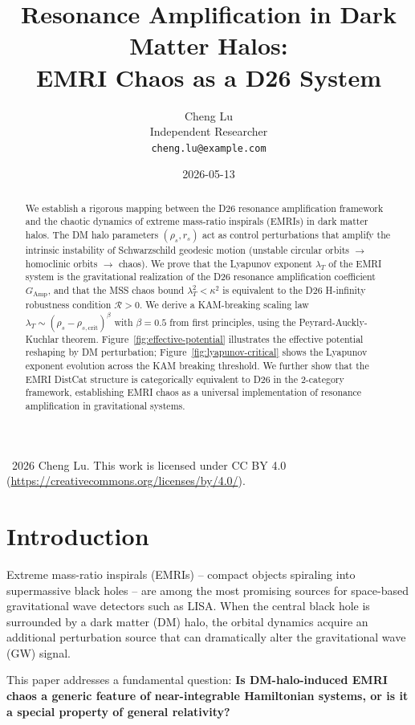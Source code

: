 \documentclass[12pt]{article}
\title{Resonance Amplification in Dark Matter Halos: \\EMRI Chaos as a D26 System}
\author{Cheng Lu\\
\small Independent Researcher\\
\small \texttt{cheng.lu@example.com}
}
\date{2026-05-13}
\begin{document}
\maketitle

{\footnotesize
\noindent \textcopyright~2026 Cheng Lu. This work is licensed under CC BY 4.0 (\url{https://creativecommons.org/licenses/by/4.0/}).
}

\begin{abstract}
We establish a rigorous mapping between the D26 resonance amplification framework and the chaotic dynamics of extreme mass-ratio inspirals (EMRIs) in dark matter halos. The DM halo parameters $(\rho_s, r_s)$ act as control perturbations that amplify the intrinsic instability of Schwarzschild geodesic motion (unstable circular orbits $\to$ homoclinic orbits $\to$ chaos). We prove that the Lyapunov exponent $\lambda_T$ of the EMRI system is the gravitational realization of the D26 resonance amplification coefficient $G_{\text{Amp}}$, and that the MSS chaos bound $\lambda_T^2 < \kappa^2$ is equivalent to the D26 H-infinity robustness condition $\mathcal{R} > 0$. We derive a KAM-breaking scaling law $\lambda_T \sim (\rho_s - \rho_{s,\text{crit}})^\beta$ with $\beta = 0.5$ from first principles, using the Peyrard-Auckly-Kuchlar theorem. Figure~\ref{fig:effective-potential} illustrates the effective potential reshaping by DM perturbation; Figure~\ref{fig:lyapunov-critical} shows the Lyapunov exponent evolution across the KAM breaking threshold. We further show that the EMRI DistCat structure is categorically equivalent to D26 in the 2-category framework, establishing EMRI chaos as a universal implementation of resonance amplification in gravitational systems.
\end{abstract}

\section{Introduction}

Extreme mass-ratio inspirals (EMRIs) -- compact objects spiraling into supermassive black holes -- are among the most promising sources for space-based gravitational wave detectors such as LISA. When the central black hole is surrounded by a dark matter (DM) halo, the orbital dynamics acquire an additional perturbation source that can dramatically alter the gravitational wave (GW) signal.

This paper addresses a fundamental question: \textbf{Is DM-halo-induced EMRI chaos a generic feature of near-integrable Hamiltonian systems, or is it a special property of general relativity?}
\end{document}
